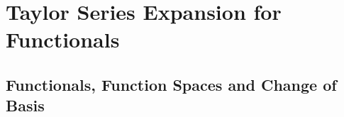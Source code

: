 

\newtheorem{theorem}{Theorem}
\newtheorem{acknowledgement}[theorem]{Acknowledgement}
\newtheorem{algorithm}[theorem]{Algorithm}
\newtheorem{axiom}[theorem]{Axiom}
\newtheorem{claim}[theorem]{Claim}
\newtheorem{conclusion}[theorem]{Conclusion}
\newtheorem{condition}[theorem]{Condition}
\newtheorem{conjecture}[theorem]{Conjecture}
\newtheorem{corollary}[theorem]{Corollary}
\newtheorem{criterion}[theorem]{Criterion}
\newtheorem{definition}[theorem]{Definition}
\newtheorem{example}[theorem]{Example}
\newtheorem{exercise}[theorem]{Exercise}
\newtheorem{lemma}[theorem]{Lemma}
\newtheorem{notation}[theorem]{Notation}
\newtheorem{problem}[theorem]{Problem}
\newtheorem{proposition}[theorem]{Proposition}
\newtheorem{remark}[theorem]{Remark}
\newtheorem{solution}[theorem]{Solution}
\newtheorem{summary}[theorem]{Summary}
\setcounter{chapter}{0}
\setcounter{page}{1}



\section{ Taylor Series Expansion for Functionals}

\subsection{Functionals, Function Spaces and Change of Basis}

